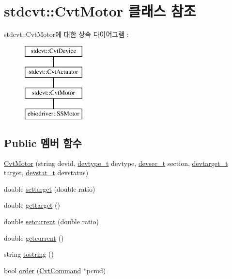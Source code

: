 \hypertarget{classstdcvt_1_1CvtMotor}{}\section{stdcvt\+:\+:Cvt\+Motor 클래스 참조}
\label{classstdcvt_1_1CvtMotor}
stdcvt\+:\+:Cvt\+Motor에 대한 상속 다이어그램 \+: \begin{figure}[H]
\begin{center}
\leavevmode
\includegraphics[height=4.000000cm]{classstdcvt_1_1CvtMotor}
\end{center}
\end{figure}
\subsection*{Public 멤버 함수}
\begin{DoxyCompactItemize}
\item 
\hyperlink{classstdcvt_1_1CvtMotor_acb443ee5de5a7c2d32ead7a4d666d729}{Cvt\+Motor} (string devid, \hyperlink{cvtcode_8h_ae8e34073e35cef0bb47c7fa535fc638b}{devtype\+\_\+t} devtype, \hyperlink{cvtcode_8h_a268eebb73363e24b9e65fd51973bd9c0}{devsec\+\_\+t} section, \hyperlink{cvtcode_8h_a2b37fd5cc4d40c0b8c4b987c271e5ceb}{devtarget\+\_\+t} target, \hyperlink{cvtcode_8h_ad21cd565f839adc5b19a0993e7da7278}{devstat\+\_\+t} devstatus)
\item 
double \hyperlink{classstdcvt_1_1CvtMotor_a309437a51deaa58ac18ead369c1ccfe9}{settarget} (double ratio)
\item 
double \hyperlink{classstdcvt_1_1CvtMotor_a1db20b33ef40adb57d0bf023602211af}{gettarget} ()
\item 
double \hyperlink{classstdcvt_1_1CvtMotor_a8fba087788280da5317b60a68a8ffe5c}{setcurrent} (double ratio)
\item 
double \hyperlink{classstdcvt_1_1CvtMotor_a748ba6cde7c70e5fd29f4919b6b1408c}{getcurrent} ()
\item 
string \hyperlink{classstdcvt_1_1CvtMotor_a93295bdf3c61854878f663fad712adaa}{tostring} ()
\item 
bool \hyperlink{classstdcvt_1_1CvtMotor_ad3ce43f87cbeaf7febac055bab4a0fbe}{order} (\hyperlink{classstdcvt_1_1CvtCommand}{Cvt\+Command} $\ast$pcmd)
\end{DoxyCompactItemize}
